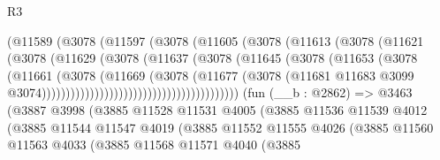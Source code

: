 \begin{lexlean}{R3}
\begin{coremodule}
                                    (@11589
                                      (@3078
                                        (@11597
                                          (@3078
                                            (@11605
                                              (@3078
                                                (@11613
                                                  (@3078
                                                    (@11621
                                                      (@3078
                                                        (@11629
                                                          (@3078
                                                            (@11637
                                                              (@3078
                                                                (@11645
                                                                  (@3078
                                                                    (@11653
                                                                      (@3078
                                                                        (@11661
                                                                          (@3078
                                                                            (@11669
                                                                              (@3078
                                                                                (@11677
                                                                                  (@3078
                                                                                    (@11681
                                                                                      @11683
                                                                                      @3099
                                                                                      @3074)))))))))))))))))))))))))))))))))))))))))
    (fun (__b : @2862) =>
    @3463
      (@3887
        @3998
        (@3885
          @11528
          @11531
          @4005
          (@3885
            @11536
            @11539
            @4012
            (@3885
              @11544
              @11547
              @4019
              (@3885
                @11552
                @11555
                @4026
                (@3885
                  @11560
                  @11563
                  @4033
                  (@3885
                    @11568
                    @11571
                    @4040
                    (@3885

\end{coremodule}
\end{lexlean}
